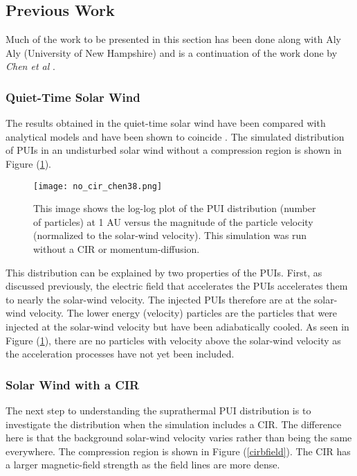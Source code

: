 \documentclass[%
 reprint,
 amsmath,amssymb,
 aps,
]{revtex4-1}
\begin{document}
\subsection{Previous Work}
Much of the work to be presented in this section has been done along with Aly Aly (University of New Hampshire) and is a continuation of the work done by \textit{Chen et al} \cite{chen}. 

\subsubsection{Quiet-Time Solar Wind}
The results obtained in the quiet-time solar wind have been compared with analytical models and have been shown to coincide \cite{chen}. The simulated distribution of PUIs in an undisturbed solar wind without a compression region is shown in Figure (\ref{qtnocir}). 

\begin{figure}[h]
\texttt{[image: no\_cir\_chen38.png]}
\caption{This image shows the log-log plot of the PUI distribution (number of particles) at 1 AU versus the magnitude of the particle velocity (normalized to the solar-wind velocity). This simulation was run without a CIR or momentum-diffusion. \label{qtnocir}}
\end{figure}

This distribution can be explained by two properties of the PUIs. First, as discussed previously, the electric field that accelerates the PUIs accelerates them to nearly the solar-wind velocity. The injected PUIs therefore are at the solar-wind velocity. The lower energy (velocity) particles are the particles that were injected at the solar-wind velocity but have been adiabatically cooled. As seen in Figure (\ref{qtnocir}), there are no particles with velocity above the solar-wind velocity as the acceleration processes have not yet been included.

\subsubsection{Solar Wind with a CIR}
The next step to understanding the suprathermal PUI distribution is to investigate the distribution when the simulation includes a CIR. The difference here is that the background solar-wind velocity varies rather than being the same everywhere. The compression region is shown in Figure (\ref{cirbfield}). The CIR has a larger magnetic-field strength as the field lines are more dense. 
\end{document}

